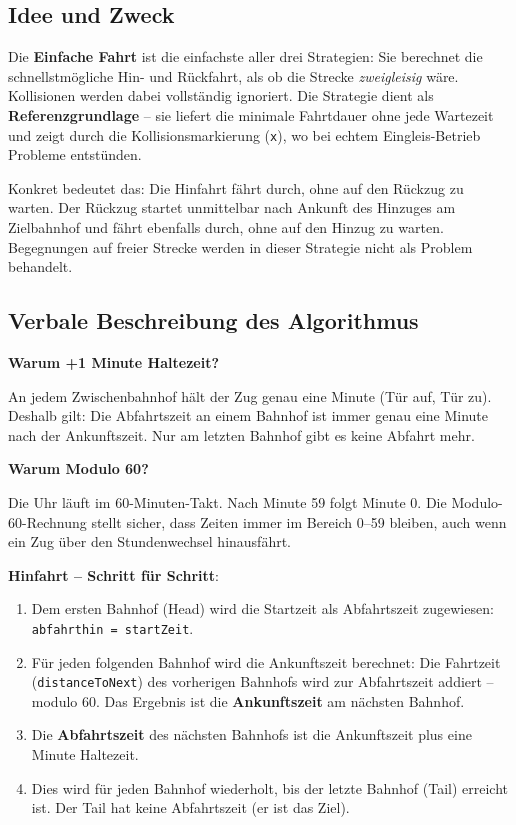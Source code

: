 \documentclass[12pt,a4paper]{article}
\begin{document}
\subsection{Idee und Zweck}

Die \textbf{Einfache Fahrt} ist die einfachste aller drei Strategien: Sie berechnet die schnellstmögliche Hin- und Rückfahrt, als ob die Strecke \emph{zweigleisig} wäre. Kollisionen werden dabei vollständig ignoriert. Die Strategie dient als \textbf{Referenzgrundlage} -- sie liefert die minimale Fahrtdauer ohne jede Wartezeit und zeigt durch die Kollisionsmarkierung (\texttt{x}), wo bei echtem Eingleis-Betrieb Probleme entstünden.

Konkret bedeutet das: Die Hinfahrt fährt durch, ohne auf den Rückzug zu warten. Der Rückzug startet unmittelbar nach Ankunft des Hinzuges am Zielbahnhof und fährt ebenfalls durch, ohne auf den Hinzug zu warten. Begegnungen auf freier Strecke werden in dieser Strategie nicht als Problem behandelt.

\subsection{Verbale Beschreibung des Algorithmus}

\textbf{Warum +1 Minute Haltezeit?}

An jedem Zwischenbahnhof hält der Zug genau eine Minute (Tür auf, Tür zu). Deshalb gilt: Die Abfahrtszeit an einem Bahnhof ist immer genau eine Minute nach der Ankunftszeit. Nur am letzten Bahnhof gibt es keine Abfahrt mehr.

\textbf{Warum Modulo 60?}

Die Uhr läuft im 60-Minuten-Takt. Nach Minute 59 folgt Minute 0. Die Modulo-60-Rechnung stellt sicher, dass Zeiten immer im Bereich 0--59 bleiben, auch wenn ein Zug über den Stundenwechsel hinausfährt.

\textbf{Hinfahrt -- Schritt für Schritt}:

\begin{enumerate}
    \item Dem ersten Bahnhof (Head) wird die Startzeit als Abfahrtszeit zugewiesen: \texttt{abfahrthin = startZeit}.
    \item Für jeden folgenden Bahnhof wird die Ankunftszeit berechnet: Die Fahrtzeit (\texttt{distanceToNext}) des vorherigen Bahnhofs wird zur Abfahrtszeit addiert -- modulo 60. Das Ergebnis ist die \textbf{Ankunftszeit} am nächsten Bahnhof.
    \item Die \textbf{Abfahrtszeit} des nächsten Bahnhofs ist die Ankunftszeit plus eine Minute Haltezeit.
    \item Dies wird für jeden Bahnhof wiederholt, bis der letzte Bahnhof (Tail) erreicht ist. Der Tail hat keine Abfahrtszeit (er ist das Ziel).
\end{enumerate}
\end{document}
